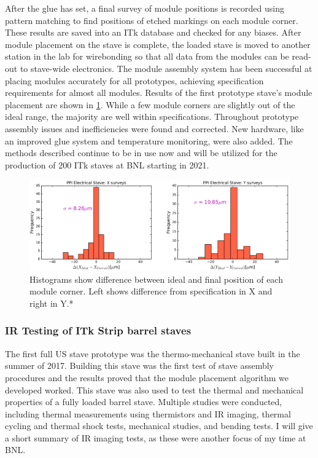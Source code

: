 After the glue has set, a final survey of module positions is recorded using pattern matching to find positions of etched markings on each module corner. These results are saved into an ITk database and checked for any biases. After module placement on the stave is complete, the loaded stave is moved to another station in the lab for wirebonding so that all data from the modules can be read-out to stave-wide electronics. The module assembly system has been successful at placing modules accurately for all prototypes, achieving specification requirements for almost all modules. Results of the first prototype stave's module placement are shown in \ref{fig:placementresults}. While a few module corners are slightly out of the ideal range, the majority are well within specifications. Throughout prototype assembly issues and inefficiencies were found and corrected. New hardware, like an improved glue system and temperature monitoring, were also added. The methods described continue to be in use now and will be utilized for the production of 200 ITk staves at BNL starting in 2021. 

\begin{figure}[!h]
        \centering
    \includegraphics[width=.8\textwidth]{Pictures/placementresults.png}
    \caption{Histograms show difference between ideal and final position of each module corner. Left shows difference from specification in X and right in Y.*}
    \label{fig:placementresults}
\end{figure}

\subsubsection{IR Testing of ITk Strip barrel staves}
The first full US stave prototype was the thermo-mechanical stave built in the summer of 2017.  Building this stave was the first test of stave assembly procedures and the results proved that the module placement algorithm we developed worked. This stave was also used to test the thermal and mechanical properties of a fully loaded barrel stave. Multiple studies were conducted, including thermal measurements using thermistors and IR imaging, thermal cycling and thermal shock tests, mechanical studies, and bending tests. I will give a short summary of IR imaging tests, as these were another focus of my time at BNL. 

